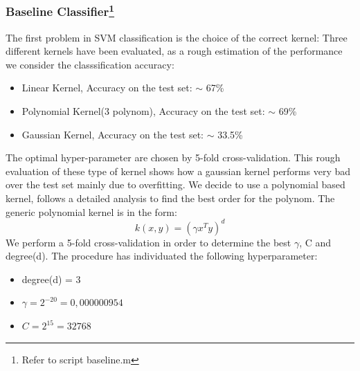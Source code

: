 \documentclass[a4paper,10pt]{article}
\begin{document}
    \subsubsection{Baseline Classifier\protect\footnote{Refer to script baseline.m}}
      The first problem in SVM classification is the choice of the correct kernel:\newline
      Three different kernels have been evaluated, as a rough estimation of the performance we consider the classsification accuracy:
      \begin{itemize}
       \item Linear Kernel, Accuracy on the test set: $\sim$ 67\%
       \item Polynomial Kernel(3\textdegree \hspace{.1mm} polynom), Accuracy on the test set: $\sim$ 69\% 
       \item Gaussian Kernel, Accuracy on the test set: $\sim$ 33.5\%
      \end{itemize}
      The optimal hyper-parameter are chosen by 5-fold cross-validation.\newline
      This rough evaluation of these type of kernel shows how a gaussian kernel performs very bad over the test set mainly due to overfitting.\newline
      We decide to use a polynomial based kernel, follows a detailed analysis to find the best order for the polynom.\newline
      The generic polynomial kernel is in the form:
      \begin{equation}
       k(x,y) = (\gamma x^Ty)^d
      \end{equation}
      We perform a 5-fold cross-validation in order to determine the best $\gamma$, C and degree(d).\newline
      The procedure has individuated the following hyperparameter:
      \begin{itemize}
       \item degree(d) = 3
       \item $\gamma = 2^{-20} = 0,000000954$
       \item $C = 2^{15} = 32768$
      \end{itemize}
\end{document}
